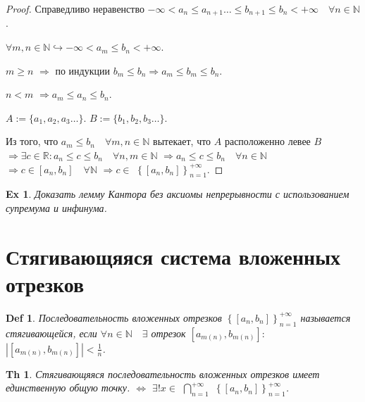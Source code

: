 \documentclass[a5paper, 10pt]{article}
\theoremstyle{plain}
\newtheorem*{theorem}{Th}
\newtheorem{definition}{Def}
\newtheorem{exersise}{Ex}
\newcommand{\N}{\mathbb N}
\newcommand{\R}{\mathbb R}
\newcommand{\hrarrow}{\hookrightarrow}
\newcommand{\Rarrow}{\Rightarrow}
\newcommand{\Lrarrow}{\Leftrightarrow}
\begin{document}
    \begin{proof}
    Справедливо неравенство
    $ -\infty < a_n \leq a_{n+1} \dots \leq b_{n+1} \leq b_n < +\infty \quad \forall n \in \N $.

    $ \forall m, n \in \N \hrarrow -\infty < a_m \leq b_n < +\infty $.

    $ m \geq n $
    $ \Rarrow $ по индукции $ b_m \leq b_n \Rarrow a_m \leq b_m \leq b_n $.

    $ n < m $
    $ \Rarrow a_m \leq a_n \leq b_n $.

    \noindent
    $ A := \{a_1, a_2, a_3 \dots \} $.
    \newline
    $ B := \{b_1, b_2, b_3 \dots \} $.

    Из того, что $ a_m \leq b_n \quad \forall m, n \in \N $
    вытекает, что $ A $ расположенно левее $ B $
    $ \Rarrow \exists c \in \R: a_n \leq c \leq b_n \quad \forall n, m \in \N $
    $ \Rarrow a_n \leq c \leq b_n \quad \forall n \in \N $
    $ \Rarrow c \in \left[ a_n, b_n \right] \quad \forall \N $
    $ \Rarrow c \in $
    $ \left\{ \left[ a_n, b_n \right] \right\}_{n=1}^{+\infty} $.
    \end{proof}

    \begin{exersise}
    Доказать лемму Кантора без аксиомы непрерывности с использованием супремума и инфинума.
    \end{exersise}

    \section{Стягивающяяся система вложенных отрезков}

    \begin{definition}
    Последовательность вложенных отрезков
    $ \left\{ \left[ a_n, b_n \right] \right\}_{n=1}^{+\infty} $
    называется стягивающейся, если
    $ \forall n \in \N \quad \exists $
    отрезок
    $ \left[ a_{m(n)}, b_{m(n)} \right]: $
    $ \left| \left[ a_{m(n)}, b_{m(n)} \right] \right| < \frac{1}{n} $.
    \end{definition}

    \begin{theorem}
    Стягивающяяся последовательность вложенных отрезков имеет единственную общую точку.
    $ \Lrarrow $
    $ \exists! x \in $
    $ \bigcap\limits_{n=1}^{+\infty} $
    $ \left\{ \left[ a_n, b_n \right] \right\}_{n=1}^{+\infty} $.
    \end{theorem}
\end{document}
